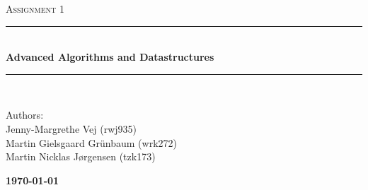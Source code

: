 \documentclass[10pt]{article}
\newcommand{\HRule}{\rule{\linewidth}{0.5mm}}
\begin{document}
\begin{titlepage}

\begin{center}

\textsc{\LARGE Assignment 1}\\%


\HRule \\[0.4cm]

{ \bfseries\large Advanced Algorithms and Datastructures}\\[1cm]

\HRule \\ [7.5cm]

\begin{minipage}{0.5\textwidth}
\begin{flushleft} \large
Authors:\\
Jenny-Margrethe Vej (rwj935)\\
Martin Gielsgaard Grünbaum (wrk272)\\
Martin Nicklas Jørgensen (tzk173)\\
\vspace{0.5cm}
\end{flushleft}
\end{minipage}
\begin{minipage}{0.4\textwidth}
\begin{flushright} {\large
\textbf{\today} }\\
\end{flushright}
\end{minipage}

\vfill



\end{center}

\end{titlepage}
\clearpage






\newpage
\appendix


\end{document}
